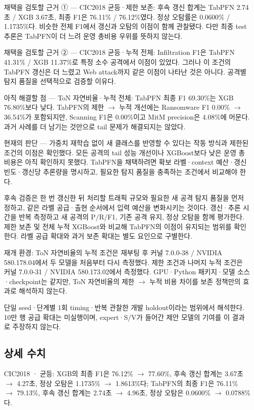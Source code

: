 채택을 검토할 근거 ① — CIC2018 균등·제한 보존: 후속 갱신 합계는 TabPFN 2.74초 /\allowbreak{} XGB 3.67초, 최종 F1은 76.11\% /\allowbreak{} 76.12\%였다. 정상 오탐률은 0.0600\% /\allowbreak{} 1.1735\%다. 비슷한 전체 F1에서 갱신과 오탐의 이점이 함께 관찰됐다. 다만 최종 test 추론은 TabPFN이 더 느려 운영 총비용 우위를 뜻하지 않는다.

채택을 검토할 근거 ② — CIC2018 균등·누적 전체: Infiltration F1은 TabPFN 41.31\% /\allowbreak{} XGB 11.37\%로 특정 소수 공격에서 이점이 있었다. 그러나 이 조건의 TabPFN 갱신은 더 느렸고 Web attack까지 같은 이점이 나타난 것은 아니다. 공격별 탐지 품질을 선택적으로 검증할 이유다.

아직 해결할 점 — ToN 자연비율·누적 전체: TabPFN 최종 F1 69.30\%는 XGB 76.80\%보다 낮다. TabPFN의 제한 \ensuremath{\rightarrow} 누적 개선에는 Ransomware F1 0.00\% \ensuremath{\rightarrow} 36.54\%가 포함되지만, Scanning F1은 0.00\%이고 MitM precision은 4.08\%에 머문다. 과거 사례를 더 남기는 것만으로 tail 문제가 해결되지는 않았다.

현재의 판단 — 가중치 재학습 없이 새 클래스를 반영할 수 있다는 작동 방식과 제한된 조건의 이점은 확인했다. 모든 공격의 tail 성능 개선이나 XGBoost보다 낮은 운영 총비용은 아직 확인하지 못했다. TabPFN을 채택하려면 확보 라벨·context 예산·갱신 빈도·갱신당 추론량을 명시하고, 필요한 탐지 품질을 충족하는 조건에서 비교해야 한다.

후속 검증은 한 번 갱신한 뒤 처리할 트래픽 규모와 필요한 새 공격 탐지 품질을 먼저 정하고, 같은 라벨 공급·출현 순서에서 입력 예산을 변화시키는 것이다. 갱신·추론 시간을 반복 측정하고 새 공격의 P/\allowbreak{}R/\allowbreak{}F1, 기존 공격 유지, 정상 오탐을 함께 평가한다. 제한 보존 및 전체 누적 XGBoost와 비교해 TabPFN의 이점이 유지되는 범위를 확인한다. 라벨 공급 확대와 과거 보존 확대는 별도 요인으로 구별한다.

재개 환경: ToN 자연비율의 누적 조건은 재부팅 후 커널 7.0.0-38 /\allowbreak{} NVIDIA 580.178.04에서 두 모델을 처음부터 다시 측정했다. 제한 조건과 나머지 누적 조건은 커널 7.0.0-31 /\allowbreak{} NVIDIA 580.173.02에서 측정했다. GPU·Python 패키지·모델 소스·checkpoint는 같지만, ToN 자연비율의 제한 \ensuremath{\rightarrow} 누적 비용 차이를 보존 정책만의 효과로 해석하지 않는다.

단일 seed·단계별 1회 timing·반복 관찰한 개발 holdout이라는 범위에서 해석한다. 10만 행 공급 확대는 미실행이며, expert·S/\allowbreak{}V가 들어간 제안 모델의 기여를 이 결과로 주장하지 않는다.

\subsection{상세 수치}
CIC2018 · 균등: XGB의 최종 F1은 76.12\% \ensuremath{\rightarrow} 77.60\%, 후속 갱신 합계는 3.67초 \ensuremath{\rightarrow} 4.27초, 정상 오탐은 1.1735\% \ensuremath{\rightarrow} 1.8613\%다; TabPFN의 최종 F1은 76.11\% \ensuremath{\rightarrow} 79.13\%, 후속 갱신 합계는 2.74초 \ensuremath{\rightarrow} 4.96초, 정상 오탐은 0.0600\% \ensuremath{\rightarrow} 0.0788\%다.

